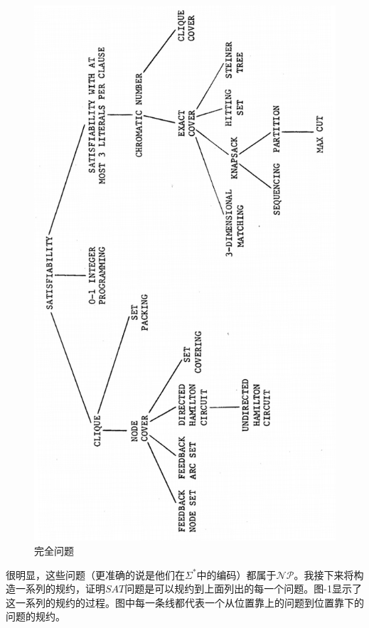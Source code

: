 \documentclass[twocolumn]{article}
\theoremstyle{nonumberplain}%
\begin{document}
    \begin{figure}
        \centering
        \includegraphics[width=12cm]{complete_problems.png}
        \caption{完全问题}
    \end{figure}

    很明显，这些问题（更准确的说是他们在$\Sigma^*$中的编码）都属于$\mathcal{NP}$。我接下来将构造一系列的规约，证明$SAT$问题是可以规约到上面列出的每一个问题。图-1显示了这一系列的规约的过程。图中每一条线都代表一个从位置靠上的问题到位置靠下的问题的规约。
\end{document}
